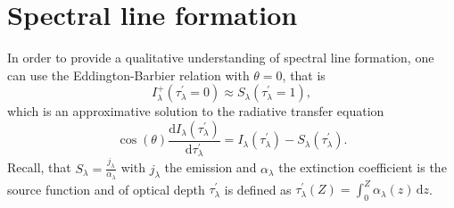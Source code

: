 \documentclass[a4paper,12pt]{report}
\begin{document}

\section{Spectral line formation}
In order to provide a qualitative understanding of spectral line formation, one can use the Eddington-Barbier relation with $\theta = 0$, that is \begin{equation}
I_\lambda^+(\tau_\lambda^\prime = 0) \approx S_\lambda(\tau_\lambda^\prime = 1),
\end{equation} which is an approximative solution to the radiative transfer equation \begin{equation}
\cos(\theta)\frac{\mathrm{d}I_\lambda(\tau_\lambda^\prime)}{\mathrm{d}\tau_\lambda^\prime} = I_\lambda(\tau_\lambda^\prime) - S_\lambda(\tau_\lambda^\prime).
\end{equation} Recall, that $S_\lambda = \frac{j_\lambda}{\alpha_\lambda}$ with $j_\lambda$ the emission and $\alpha_\lambda$ the extinction coefficient is the source function and of optical depth $\tau_\lambda^\prime$ is defined as $\tau_\lambda^\prime(Z)  = \int_{0}^{Z}\alpha_\lambda(z)\,\mathrm{d}z$.
\end{document}
